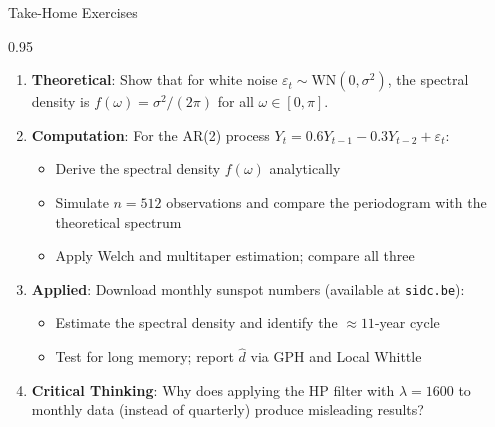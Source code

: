 \documentclass[9pt, aspectratio=169, t]{beamer}
\begin{document}
\begin{frame}{Take-Home Exercises}
    \begin{cminipage}{0.95\textwidth}
    {\footnotesize
    \begin{enumerate}\setlength{\itemsep}{2pt}
        \item \textbf{Theoretical}: Show that for white noise $\varepsilon_t \sim \mathrm{WN}(0,\sigma^2)$, the spectral density is $f(\omega) = \sigma^2/(2\pi)$ for all $\omega \in [0,\pi]$.

        \item \textbf{Computation}: For the AR(2) process $Y_t = 0.6Y_{t-1} - 0.3Y_{t-2} + \varepsilon_t$:
            \begin{itemize}\setlength{\itemsep}{0pt}
                \item Derive the spectral density $f(\omega)$ analytically
                \item Simulate $n = 512$ observations and compare the periodogram with the theoretical spectrum
                \item Apply Welch and multitaper estimation; compare all three
            \end{itemize}

        \item \textbf{Applied}: Download monthly sunspot numbers (available at \texttt{sidc.be}):
            \begin{itemize}\setlength{\itemsep}{0pt}
                \item Estimate the spectral density and identify the $\approx 11$-year cycle
                \item Test for long memory; report $\hat{d}$ via GPH and Local Whittle
            \end{itemize}

        \item \textbf{Critical Thinking}: Why does applying the HP filter with $\lambda = 1600$ to monthly data (instead of quarterly) produce misleading results?
    \end{enumerate}
    }
    \end{cminipage}
\end{frame}
\end{document}

